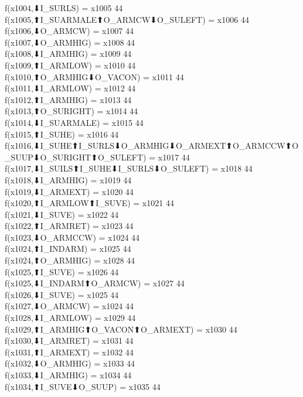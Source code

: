 f(x1004,⬇I_SURLS) = x1005 {44} \\
f(x1005,⬆I_SUARMALE⬆O_ARMCW⬇O_SULEFT) = x1006 {44} \\
f(x1006,⬇O_ARMCW) = x1007 {44} \\
f(x1007,⬇O_ARMHIG) = x1008 {44} \\
f(x1008,⬇I_ARMHIG) = x1009 {44} \\
f(x1009,⬆I_ARMLOW) = x1010 {44} \\
f(x1010,⬆O_ARMHIG⬇O_VACON) = x1011 {44} \\
f(x1011,⬇I_ARMLOW) = x1012 {44} \\
f(x1012,⬆I_ARMHIG) = x1013 {44} \\
f(x1013,⬆O_SURIGHT) = x1014 {44} \\
f(x1014,⬇I_SUARMALE) = x1015 {44} \\
f(x1015,⬆I_SUHE) = x1016 {44} \\
f(x1016,⬇I_SUHE⬆I_SURLS⬇O_ARMHIG⬇O_ARMEXT⬆O_ARMCCW⬆O_SUUP⬇O_SURIGHT⬆O_SULEFT) = x1017 {44} \\
f(x1017,⬇I_SUILS⬆I_SUHE⬇I_SURLS⬇O_SULEFT) = x1018 {44} \\
f(x1018,⬇I_ARMHIG) = x1019 {44} \\
f(x1019,⬇I_ARMEXT) = x1020 {44} \\
f(x1020,⬆I_ARMLOW⬆I_SUVE) = x1021 {44} \\
f(x1021,⬇I_SUVE) = x1022 {44} \\
f(x1022,⬆I_ARMRET) = x1023 {44} \\
f(x1023,⬇O_ARMCCW) = x1024 {44} \\
f(x1024,⬆I_INDARM) = x1025 {44} \\
f(x1024,⬆O_ARMHIG) = x1028 {44} \\
f(x1025,⬆I_SUVE) = x1026 {44} \\
f(x1025,⬇I_INDARM⬆O_ARMCW) = x1027 {44} \\
f(x1026,⬇I_SUVE) = x1025 {44} \\
f(x1027,⬇O_ARMCW) = x1024 {44} \\
f(x1028,⬇I_ARMLOW) = x1029 {44} \\
f(x1029,⬆I_ARMHIG⬆O_VACON⬆O_ARMEXT) = x1030 {44} \\
f(x1030,⬇I_ARMRET) = x1031 {44} \\
f(x1031,⬆I_ARMEXT) = x1032 {44} \\
f(x1032,⬇O_ARMHIG) = x1033 {44} \\
f(x1033,⬇I_ARMHIG) = x1034 {44} \\
f(x1034,⬆I_SUVE⬇O_SUUP) = x1035 {44} \\
